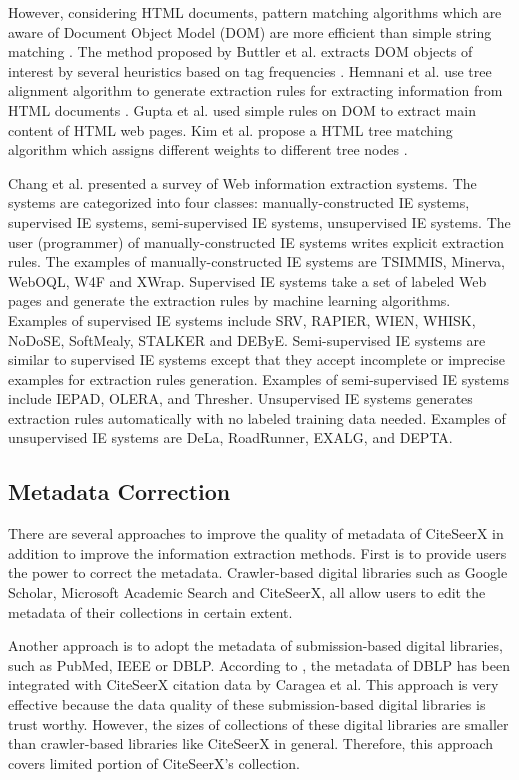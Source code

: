 \documentclass[prodmode]{acmsmall} %
\begin{document}
However, considering HTML documents, pattern matching algorithms which are aware of Document Object Model (DOM) are more efficient than simple string matching \cite{kim2007web}. The method proposed by Buttler et al. extracts DOM objects of interest by several heuristics based on tag frequencies \cite{buttler2001fully}. Hemnani et al. use tree alignment algorithm to generate extraction rules for extracting information from HTML documents \cite{hemnani2002information}. Gupta et al. used simple rules on DOM to extract main content of HTML web pages. Kim et al. propose a  HTML tree matching algorithm which assigns different weights to different tree nodes \cite{kim2007web}.

Chang et al. \cite{chang2006survey} presented a survey of Web information extraction systems. The systems are categorized into four classes: manually-constructed IE systems, supervised IE systems, semi-supervised IE systems, unsupervised IE systems. The user (programmer) of manually-constructed IE systems writes explicit extraction rules. The examples of manually-constructed IE systems are TSIMMIS, Minerva, WebOQL, W4F and XWrap. Supervised IE systems take a set of labeled Web pages and generate the extraction rules by machine learning algorithms. Examples of supervised IE systems include SRV, RAPIER, WIEN, WHISK, NoDoSE, SoftMealy, STALKER and DEByE. Semi-supervised IE systems are similar to supervised IE systems except that they accept incomplete or imprecise examples for extraction rules generation. Examples of semi-supervised IE systems include IEPAD, OLERA, and Thresher. Unsupervised IE systems generates extraction rules automatically with no labeled training data needed. Examples of unsupervised IE systems are DeLa, RoadRunner, EXALG, and DEPTA.

\subsection{Metadata Correction}

There are several approaches to improve the quality of metadata of CiteSeerX in addition to improve the information extraction methods. First is to provide users the power to correct the metadata. Crawler-based digital libraries such as Google Scholar, Microsoft Academic Search and CiteSeerX, all allow users to edit the metadata of their collections in certain extent. \cite{wu2014impact}

Another approach is to adopt the metadata of submission-based digital libraries, such as PubMed, IEEE or DBLP. According to \cite{ororbiaciteseerx}, the metadata of DBLP has been integrated with CiteSeerX citation data by Caragea et al. This approach is very effective because the data quality of these submission-based digital libraries is trust worthy. However, the sizes of collections of these digital libraries are smaller than crawler-based libraries like CiteSeerX in general. Therefore, this approach covers limited portion of CiteSeerX's collection.
\end{document}
